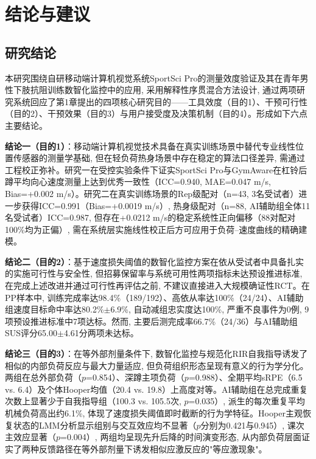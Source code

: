 
\chapter{结论与建议}

\section{研究结论}
\label{sec:conclusions}

本研究围绕自研移动端计算机视觉系统SportSci Pro的测量效度验证及其在青年男性下肢抗阻训练数智化监控中的应用, 采用解释性序贯混合方法设计, 通过两项研究系统回应了第1章提出的四项核心研究目的——工具效度（目的1）、干预可行性（目的2）、干预效果（目的3）与用户接受度及决策机制（目的4）。形成如下六点主要结论。

\textbf{结论一（目的1）}：移动端计算机视觉技术具备在真实训练场景中替代专业线性位置传感器的测量学基础, 但在轻负荷热身场景中存在稳定的算法口径差异, 需通过工程校正弥补。研究一在受控实验条件下证实SportSci Pro与GymAware在杠铃后蹲平均向心速度测量上达到优秀一致性（ICC=0.940, MAE=0.047 m/s, Bias=+0.002 m/s）。研究二在真实训练场景的Rep级配对（n=43, 3名受试者）进一步获得ICC=0.991（Bias=+0.0019 m/s）, 热身级配对（n=88, AI辅助组全体11名受试者）ICC=0.987, 但存在+0.0212 m/s的稳定系统性正向偏移（88对配对100\%均为正偏）, 需在系统层实施线性校正后方可应用于负荷--速度曲线的精确建模。

\textbf{结论二（目的2）}：基于速度损失阈值的数智化监控方案在依从受试者中具备扎实的实施可行性与安全性, 但招募保留率与系统可用性两项指标未达预设推进标准, 在完成上述改进并通过可行性再评估之前, 不建议直接进入大规模确证性RCT。在PP样本中, 训练完成率达98.4\%（189/192）、高依从率达100\%（24/24）、AI辅助组速度目标命中率达80.2\%$\pm$6.9\%, 自动减组忠实度达100\%, 严重不良事件为0例, 9项预设推进标准中7项达标。然而, 主要后测完成率66.7\%（24/36）与AI辅助组SUS评分65.00$\pm$4.61分两项未达标。

\textbf{结论三（目的3）}：在等外部剂量条件下, 数智化监控与规范化RIR自我指导诱发了相似的内部负荷反应与最大力量适应, 但负荷组织形态呈现有意义的行为学分化。两组在总外部负荷（$p$=0.854）、深蹲主项负荷（$p$=0.988）、全期平均sRPE（6.5 vs. 6.4）及个体Hooper均值（20.4 vs. 19.8）上高度对等。AI辅助组在总完成重复次数上显著少于自我指导组（100.3 vs. 105.5次, $p$=0.035）, 派生的每次重复平均机械负荷高出约6.1\%, 体现了速度损失阈值即时截断的行为学特征。Hooper主观恢复状态的LMM分析显示组别与交互效应均不显著（$p$分别为0.421与0.945）, 课次主效应显著（$p$=0.004）, 两组均呈现先升后降的时间演变形态, 从内部负荷层面证实了两种反馈路径在等外部剂量下诱发相似应激反应的"等应激现象"。

